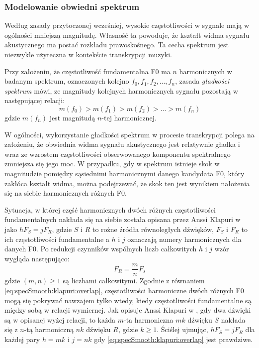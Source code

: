 \documentclass[12pt,a4paper,twoside]{mwart}
\begin{document}
\subsubsection{Modelowanie obwiedni spektrum}\label{sec:specSmoothnes}
Według zasady przytoczonej wcześniej, wysokie częstotliwości w sygnale mają w ogólności mniejszą magnitudę. Własność ta powoduje, że kształt widma sygnału akustycznego ma postać rozkładu prawoskośnego. Ta cecha spektrum jest niezwykle użyteczna w kontekście transkrypcji muzyki.

Przy założeniu, że częstotliwość fundamentalna F0 ma $n$ harmonicznych w badanym spektrum, oznaczonych kolejno $f_0, f_1, f_2, ..., f_n$, zasada \textit{gładkości spektrum} mówi, ze magnitudy kolejnych harmonicznych sygnału pozostają w następującej relacji:
\begin{equation}\label{eq:specSmooth:principle}
  m(f_0) > m(f_1) > m(f_2) > ... > m(f_n)
\end{equation}
gdzie $m(f_n)$ jest magnitudą $n$-tej harmonicznej.

W ogólności, wykorzystanie gładkości spektrum w procesie transkrypcji polega na założeniu, że obwiednia widma sygnału akustycznego jest relatywnie gładka i wraz ze wzrostem częstotliwości obserwowanego komponentu spektralnego zmniejsza się jego moc. W przypadku, gdy w spektrum istnieje skok w magnitudzie pomiędzy sąsiednimi harmonicznymi danego kandydata F0, który zakłóca kształt widma, można podejrzewać, że skok ten jest wynikiem nałożenia się na siebie harmonicznych różnych F0.

Sytuacja, w której część harmonicznych dwóch różnych częstotliwości fundamentalnych nakłada się na siebie została opisana przez Anssi Klapuri w 
\cite[3382]{Transcription:Klapuri:MultipitchEstimationAndSeparation} 
jako $hF_S = jF_R$, gdzie $S$ i $R$ to rożne źródła równoległych dźwięków, $F_S$ i $F_R$ to ich częstotliwości fundamentalne a $h$ i $j$ oznaczają numery harmonicznych dla danych F0. Po redukcji czynników wspólnych liczb całkowitych $h$ i $j$ wzór wygląda następująco:
\begin{equation}\label{eq:specSmooth:klapuri:overlap}
  F_R = \frac{m}{n}F_s
\end{equation}
gdzie $(m, n) \geqslant 1$ są liczbami całkowitymi. Zgodnie z równaniem \ref{eq:specSmooth:klapuri:overlap}, częstotliwości harmoniczne dwóch różnych F0 mogą się pokrywać nawzajem tylko wtedy, kiedy częstotliwości fundamentalne są między sobą w relacji wymiernej. Jak opisuje Anssi Klapuri w 
\cite[3382]{Transcription:Klapuri:MultipitchEstimationAndSeparation},
gdy dwa dźwięki są w opisanej wyżej relacji, to każda $m$-ta harmoniczna $mk$ dźwięku $S$ nakłada się z $n$-tą harmoniczną $nk$ dźwięku $R$, gdzie $k \geqslant 1$. Ściślej ujmując, $hF_S = jF_R$ dla każdej pary $h=mk$ i $j=nk$ gdy \ref{eq:specSmooth:klapuri:overlap} jest prawdziwe.
\end{document}
